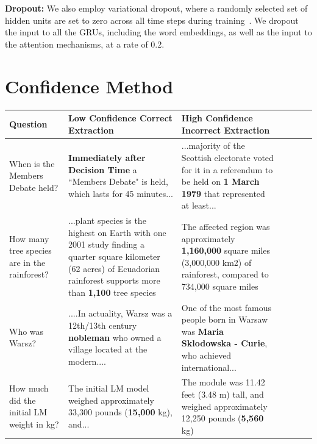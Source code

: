 \documentclass[11pt,a4paper]{article}
\begin{document}
\textbf{Dropout:}
We also employ variational dropout, where a randomly selected set of hidden units are set to zero across all time steps during training~\cite{variational_dropout}. We dropout the input to all the GRUs, including the word embeddings, as well as the input to the attention mechanisms, at a rate of 0.2. 

\section{Confidence Method}
\label{sect:multi-paragraph}

\begin{table}
\begin{small}
\begin{center}
\begin{tabular}{ | l | l | l | c | l | l | c |}
\hline 
Question & Low Confidence Correct Extraction & High Confidence Incorrect Extraction \\ 
\hline
\parbox{3cm}{When is the Members Debate held?} & \parbox{5.7cm}{\textbf{Immediately after Decision Time} a ``Members Debate" is held, which lasts for 45 minutes...} & \parbox{5.7cm}{...majority of the Scottish electorate voted for it in a referendum to be held on \textbf{1 March 1979} that represented at least...} 
\\[0.6cm]

\hline
\parbox{3cm}{How many tree species are in the rainforest?} &\parbox{5.7cm}{...plant species is the highest on Earth with one 2001 study finding a quarter square kilometer (62 acres) of Ecuadorian rainforest supports more than \textbf{1,100} tree species } & \parbox{5.7cm}{The affected region was approximately \textbf{1,160,000} square miles (3,000,000 km2) of rainforest, compared to 734,000 square miles} \\[0.6cm]


\hline
Who was Warsz? & \parbox{5.7cm}{....In actuality, Warsz was a 12th/13th century \textbf{nobleman} who owned a village located at the modern....} & \parbox{5.7cm}{One of the most famous people born in Warsaw was \textbf{Maria Sklodowska - Curie}, who achieved international...} \\[0.5cm]
\hline
\parbox{3cm}{How much did the initial LM weight in kg?} & \parbox{5.7cm}{The initial LM model weighed approximately 33,300 pounds (\textbf{15,000} kg), and...} & \parbox{5.7cm}{The module was 11.42 feet (3.48 m) tall, and 
weighed approximately 12,250 pounds (\textbf{5,560} kg)} \\[0.5cm]


\end{tabular}
\end{center}
\end{small}
\end{table}
\end{document}
